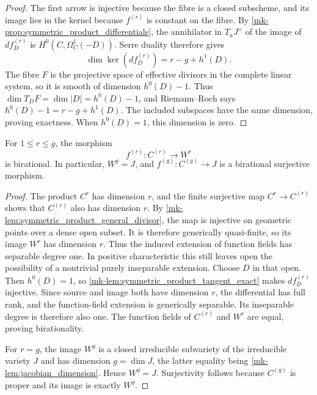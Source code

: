 \begin{proof}
  The first arrow is injective because the fibre is a closed subscheme, and
  its image lies in the kernel because \(f^{(r)}\) is constant on the
  fibre.  By \ref{mk-prop:symmetric_product_differentials}, the annihilator
  in \(T_aJ^\vee\) of the image of \(d f^{(r)}_D\) is
  \(H^0(C,\Omega_C^1(-D))\).  Serre duality therefore gives
  \[
    \dim\ker(d f^{(r)}_D)=r-g+h^1(D).
  \]
  The fibre \(F\) is the projective space of effective divisors in the
  complete linear system, so it is smooth of dimension \(h^0(D)-1\).
  Thus \(\dim T_DF=\dim|D|=h^0(D)-1\), and Riemann--Roch says
  \(h^0(D)-1=r-g+h^1(D)\).  The included subspaces have the same
  dimension, proving exactness.  When \(h^0(D)=1\), this dimension is zero.
\end{proof}

\begin{lemma}
  \label{mk-lem:symmetric_product_to_jacobian}

  For \(1\le r\le g\), the morphism
  \[
    f^{(r)}\colon C^{(r)}\longrightarrow W^r
  \]
  is birational.  In particular, \(W^g=J\), and
  \(f^{(g)}\colon C^{(g)}\to J\) is a birational surjective morphism.
\end{lemma}

\begin{proof}
  The product \(C^r\) has dimension \(r\), and the finite surjective map
  \(C^r\to C^{(r)}\) shows that \(C^{(r)}\) also has dimension \(r\).
  By \ref{mk-lem:symmetric_product_general_divisor}, the map is injective on
  geometric points over a dense open subset.  It is therefore generically
  quasi-finite, so its image \(W^r\) has dimension \(r\).  Thus the induced
  extension of function fields has separable degree one.  In positive characteristic
  this still leaves open the possibility of a nontrivial purely
  inseparable extension.  Choose \(D\) in that open.  Then \(h^0(D)=1\),
  so \ref{mk-lem:symmetric_product_tangent_exact} makes
  \(d f^{(r)}_D\) injective.  Since source and image both have dimension
  \(r\), the differential has full rank, and the function-field extension
  is generically separable.  Its inseparable degree is therefore also one.
  The function fields of \(C^{(r)}\) and \(W^r\) are equal, proving
  birationality.

  For \(r=g\), the image \(W^g\) is a closed irreducible subvariety of the
  irreducible variety \(J\) and has dimension \(g=\dim J\), the latter
  equality being \ref{mk-lem:jacobian_dimension}.  Hence
  \(W^g=J\).  Surjectivity follows because \(C^{(g)}\) is proper and its
  image is exactly \(W^g\).
\end{proof}

